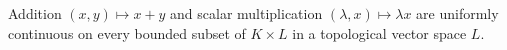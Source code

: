 Addition $(x, y) \mapsto x + y$ and scalar multiplication $(\lambda, x) \mapsto \lambda x$ are uniformly continuous on every bounded subset of $K \times L$ in a topological vector space $L$.
